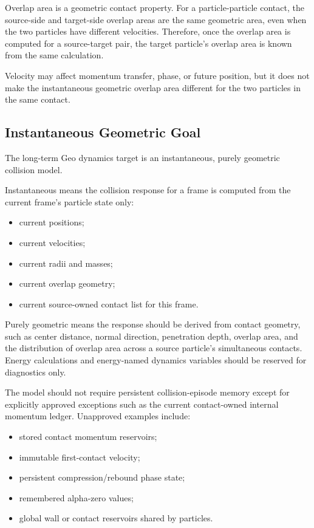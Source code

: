 Overlap area is a geometric contact property.  For a particle-particle contact,
the source-side and target-side overlap areas are the same geometric area, even
when the two particles have different velocities.  Therefore, once the overlap
area is computed for a source-target pair, the target particle's overlap area is
known from the same calculation.

Velocity may affect momentum transfer, phase, or future position, but it does
not make the instantaneous geometric overlap area different for the two
particles in the same contact.

\subsection{Instantaneous Geometric Goal}

The long-term Geo dynamics target is an instantaneous, purely geometric
collision model.

Instantaneous means the collision response for a frame is computed from the
current frame's particle state only:

\begin{itemize}
    \item current positions;
    \item current velocities;
    \item current radii and masses;
    \item current overlap geometry;
    \item current source-owned contact list for this frame.
\end{itemize}

Purely geometric means the response should be derived from contact geometry,
such as center distance, normal direction, penetration depth, overlap area, and
the distribution of overlap area across a source particle's simultaneous
contacts.  Energy calculations and energy-named dynamics variables should be
reserved for diagnostics only.

The model should not require persistent collision-episode memory except for
explicitly approved exceptions such as the current contact-owned internal
momentum ledger.  Unapproved examples include:

\begin{itemize}
    \item stored contact momentum reservoirs;
    \item immutable first-contact velocity;
    \item persistent compression/rebound phase state;
    \item remembered alpha-zero values;
    \item global wall or contact reservoirs shared by particles.
\end{itemize}


